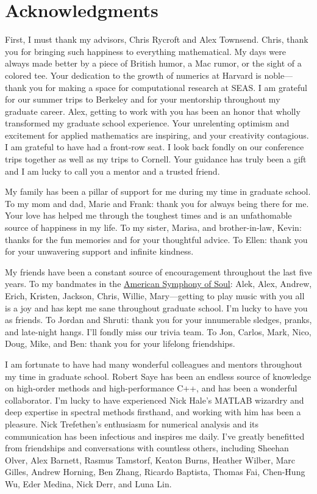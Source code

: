 \begingroup
\let\clearpage\relax
\let\cleardoublepage\relax
\let\cleardoublepage\relax

\chapter*{Acknowledgments}

First, I must thank my advisors, Chris Rycroft and Alex Townsend. Chris, thank you for bringing such happiness to everything mathematical. My days were always made better by a piece of British humor, a Mac rumor, or the sight of a colored tee. Your dedication to the growth of numerics at Harvard is noble---thank you for making a space for computational research at SEAS. I am grateful for our summer trips to Berkeley and for your mentorship throughout my graduate career. Alex, getting to work with you has been an honor that wholly transformed my graduate school experience. Your unrelenting optimism and excitement for applied mathematics are inspiring, and your creativity contagious. I am grateful to have had a front-row seat. I look back fondly on our conference trips together as well as my trips to Cornell. Your guidance has truly been a gift and I am lucky to call you a mentor and a trusted friend.

My family has been a pillar of support for me during my time in graduate school. To my mom and dad, Marie and Frank: thank you for always being there for me. Your love has helped me through the toughest times and is an unfathomable source of happiness in my life. To my sister, Marisa, and brother-in-law, Kevin: thanks for the fun memories and for your thoughtful advice.  To Ellen: thank you for your unwavering support and infinite kindness.

My friends have been a constant source of encouragement throughout the last five years. To my bandmates in the \href{https://americansymphonyofsoul.com/}{American Symphony of Soul}: Alek, Alex, Andrew, Erich, Kristen, Jackson, Chris, Willie, Mary---getting to play music with you all is a joy and has kept me sane throughout graduate school. I'm lucky to have you as friends. To Jordan and Shruti: thank you for your innumerable sledges, pranks, and late-night hangs. I'll fondly miss our trivia team. To Jon, Carlos, Mark, Nico, Doug, Mike, and Ben: thank you for your lifelong friendships.

I am fortunate to have had many wonderful colleagues and mentors throughout my time in graduate school. Robert Saye has been an endless source of knowledge on high-order methods and high-performance C++, and has been a wonderful collaborator. I'm lucky to have experienced Nick Hale's MATLAB wizardry and deep expertise in spectral methods firsthand, and working with him has been a pleasure. Nick Trefethen's enthusiasm for numerical analysis and its communication has been infectious and inspires me daily. I've greatly benefitted from friendships and conversations with countless others, including Sheehan Olver, Alex Barnett, Rasmus Tamstorf, Keaton Burns, Heather Wilber, Marc Gilles, Andrew Horning, Ben Zhang, Ricardo Baptista, Thomas Fai, Chen-Hung Wu, Eder Medina, Nick Derr, and Luna Lin.

